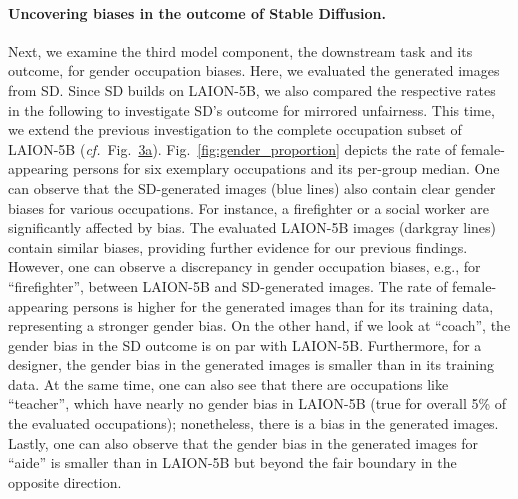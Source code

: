 \documentclass{article}%
\newcommand{\cf}{\emph{cf.}~}
\begin{document}
\paragraph{Uncovering biases in the outcome of Stable Diffusion.}
Next, we examine the third model component, the downstream task and its outcome, for gender occupation biases. Here, we evaluated the generated images from SD. Since SD builds on LAION-5B, we also compared the respective rates in the following to investigate SD's outcome for mirrored unfairness.
This time, we extend the previous investigation to the complete occupation subset of LAION-5B (\cf Fig.~\hyperref[fig:dataset-stats]{3a}).
Fig.~\ref{fig:gender_proportion} depicts the rate of female-appearing persons for six exemplary occupations and its per-group median. One can observe that the SD-generated images (blue lines) also contain clear gender biases for various occupations. For instance, a firefighter or a social worker are significantly affected by bias. The evaluated LAION-5B images (darkgray lines) contain similar biases, providing further evidence for our previous findings. %
However, one can observe a discrepancy in gender occupation biases, e.g., for ``firefighter'', between LAION-5B and SD-generated images. The rate of female-appearing persons is higher for the generated images than for its training data, representing a stronger gender bias. On the other hand, if we look at ``coach'', the gender bias in the SD outcome is on par with LAION-5B. Furthermore, for a designer, the gender bias in the generated images is smaller than in its training data. At the same time, one can also see that there are occupations like ``teacher'', which have nearly no gender bias in LAION-5B (true for overall 5\% of the evaluated occupations); nonetheless, there is a bias in the generated images. Lastly, one can also observe that the gender bias in the generated images for ``aide'' is smaller than in LAION-5B but beyond the fair boundary in the opposite direction. 
\end{document}
